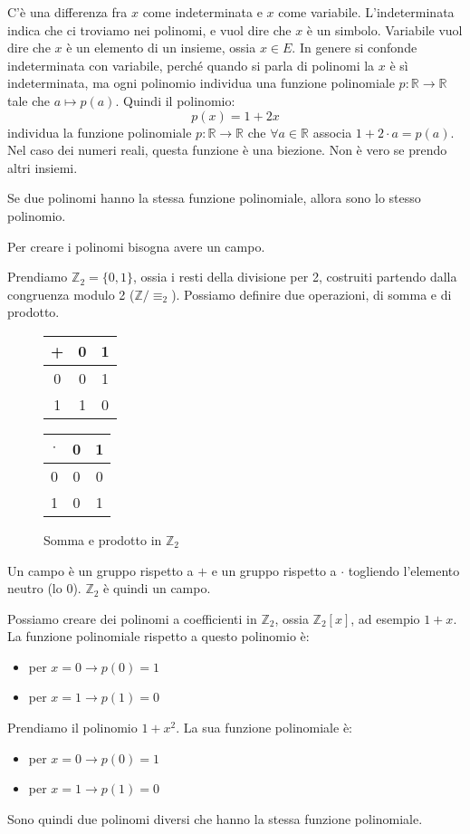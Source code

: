 C'\`e una differenza fra $x$ come indeterminata e $x$ come variabile. L'indeterminata indica che ci troviamo nei polinomi, e vuol dire che $x$ \`e un simbolo. Variabile vuol dire che $x$ \`e un elemento di un insieme, ossia $x \in E$. In genere si confonde indeterminata con variabile, perch\'e quando si parla di polinomi la $x$ \`e s\`i indeterminata, ma ogni polinomio individua una funzione polinomiale $p : \mathbb{R} \to \mathbb{R}$ tale che $ a \mapsto p(a)$. Quindi il polinomio:
\[
p(x) = 1 + 2x
\]
individua la funzione polinomiale $p : \mathbb{R} \to \mathbb{R}$ che $ \forall a \in \mathbb{R}$ associa $1 + 2 \cdot a = p(a)$. Nel caso dei numeri reali, questa funzione \`e una biezione. Non \`e vero se prendo altri insiemi.

\begin{defn}
Se due polinomi hanno la stessa funzione polinomiale, allora sono lo stesso polinomio. 
\end{defn}

Per creare i polinomi bisogna avere un campo.

Prendiamo $\mathbb{Z}_2 = \{ 0, 1 \}$, ossia i resti della divisione per 2, costruiti partendo dalla congruenza modulo 2 ($\mathbb{Z} / \equiv_2$). Possiamo definire due operazioni, di somma e di prodotto.

\begin{figure}[ht]
\centering
\begin{tabular}{c|cc}
+ & 0 & 1 \\
\hline
0 & 0 & 1 \\
1 & 1 & 0
\end{tabular}
\quad
\begin{tabular}{c|cc}
$\cdot$ & 0 & 1 \\
\hline
0 & 0 & 0 \\
1 & 0 & 1
\end{tabular}
\caption{Somma e prodotto in $\mathbb{Z}_2$}
\end{figure}

Un campo \`e un gruppo rispetto a $+$ e un gruppo rispetto a $\cdot$ togliendo l'elemento neutro (lo 0). $\mathbb{Z}_2$ \`e quindi un campo.

Possiamo creare dei polinomi a coefficienti in $\mathbb{Z}_2$, ossia $\mathbb{Z}_2[x]$, ad esempio $1 + x$. La funzione polinomiale rispetto a questo polinomio \`e:
\begin{itemize}
    \item per $x = 0 \to p(0) = 1$
    \item per $x = 1 \to p(1) = 0$
\end{itemize}
Prendiamo il polinomio $1 + x^2$. La sua funzione polinomiale \`e:
\begin{itemize}
    \item per $x = 0 \to p(0) = 1$
    \item per $x = 1 \to p(1) = 0$
\end{itemize}
Sono quindi due polinomi diversi che hanno la stessa funzione polinomiale.


